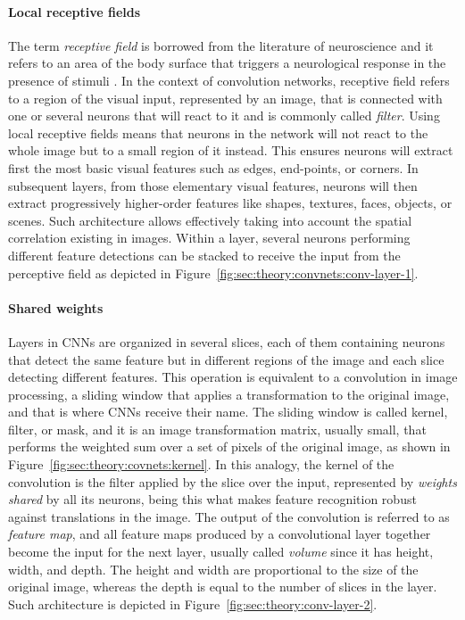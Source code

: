 \paragraph{Local receptive fields}
The term \emph{receptive field} is borrowed from the literature of neuroscience and it refers to an area of the body surface that triggers a neurological response in the presence of stimuli \cite{Sherrington1906,Alonso2008}.
In the context of convolution networks, receptive field refers to a region of the visual input, represented by an image, that is connected with one or several neurons that will react to it and is commonly called \emph{filter}.
Using local receptive fields means that neurons in the network will not react to the whole image but to a small region of it instead.
This ensures neurons will extract first the most basic visual features such as edges, end-points, or corners.
In subsequent layers, from those elementary visual features, neurons will then extract progressively higher-order features like shapes, textures, faces, objects, or scenes.
Such architecture allows effectively taking into account the spatial correlation existing in images.
Within a layer, several neurons performing different feature detections can be stacked to receive the input from the perceptive field as depicted in Figure~\ref{fig:sec:theory:convnets:conv-layer-1}.

\paragraph{Shared weights}
Layers in CNNs are organized in several slices, each of them containing neurons that detect the same feature but in different regions of the image and each slice detecting different features.
This operation is equivalent to a convolution in image processing, a sliding window that applies a transformation to the original image, and that is where CNNs receive their name.
The sliding window is called kernel, filter, or mask, and it is an image transformation matrix, usually small, that performs the weighted sum over a set of pixels of the original image, as shown in Figure~\ref{fig:sec:theory:covnets:kernel}.
In this analogy, the kernel of the convolution is the filter applied by the slice over the input, represented by \emph{weights shared} by all its neurons, being this what makes feature recognition robust against translations in the image.
The output of the convolution is referred to as \emph{feature map}, and all feature maps produced by a convolutional layer together become the input for the next layer, usually called \emph{volume} since it has height, width, and depth.
The height and width are proportional to the size of the original image, whereas the depth is equal to the number of slices in the layer.
Such architecture is depicted in Figure~\ref{fig:sec:theory:conv-layer-2}.

